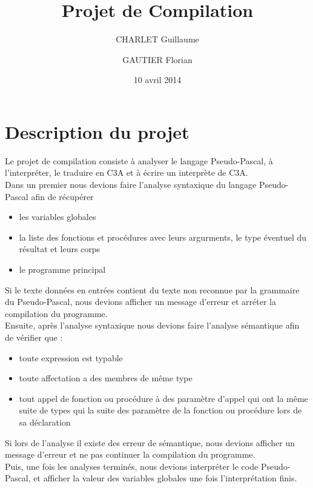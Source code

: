 \documentclass{report}
\title{Projet de Compilation}
\author{CHARLET Guillaume \and GAUTIER Florian}
\date{10 avril 2014}
\begin{document}
\maketitle

\tableofcontents

\newpage

\section{Description du projet}
Le projet de compilation consiste à analyser le langage Pseudo-Pascal, à l’interpréter, le traduire en C3A et à écrire un interprète de C3A.\\

Dans un premier nous devions faire l'analyse syntaxique du langage Pseudo-Pascal afin de récupérer
\begin{itemize}
\item les variables globales
\item la liste des fonctions et procédures avec leurs argurments, le type éventuel du résultat et leurs corps
\item le programme principal
\end{itemize}

Si le texte données en entrées contient du texte non reconnue par la grammaire du Pseudo-Pascal, nous devions afficher un message d'erreur et arréter la compilation du programme.\\

Ensuite, après l'analyse syntaxique nous devions faire l'analyse sémantique afin de vérifier que :
\begin{itemize}
\item toute expression est typable
\item toute affectation a des membres de même type
\item tout appel de fonction ou procédure à des paramètre d'appel qui ont la même suite de types qui la suite des paramètre de la fonction ou procédure lors de sa déclaration
\end{itemize}

Si lors de l'analyse il existe des erreur de sémantique, nous devions afficher un message d'erreur et ne pas continuer la compilation du programme.\\

Puis, une fois les analyses terminés, nous devions interpréter le code Pseudo-Pascal, et afficher la valeur des variables globales une fois l'interprétation finis.\\
\end{document}
